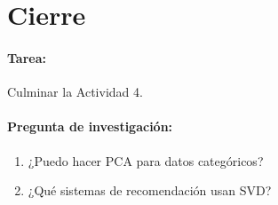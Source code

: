 \documentclass[a4,11pt]{aleph-notas}
\begin{document}
\section*{Cierre}

\paragraph{Tarea:} Culminar la Actividad 4.
    
    
\paragraph{Pregunta de investigación:} 
\begin{enumerate}
    \item ¿Puedo hacer PCA para datos categóricos?
    \item ¿Qué sistemas de recomendación usan SVD?

\end{enumerate}
    
\end{document}
